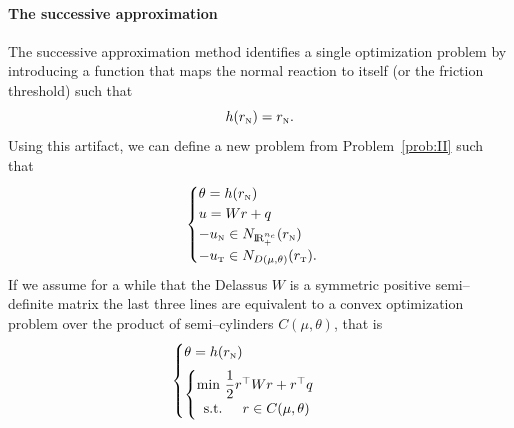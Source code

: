 {%

\paragraph{The successive approximation} The successive approximation method identifies a single optimization problem by introducing a function that maps the normal reaction to itself (or the friction threshold) such that
\begin{equation}
  \label{eq:Haslinger-g}
  h(r_\n)  = r_\n.
\end{equation}
Using this artifact, we can define a new problem from Problem~\ref{prob:II} such that
\begin{equation}
  \label{eq:Haslinger-1}
  \begin{cases}
    \theta = h(r_\n) \\
    u = W r + q \\
    -u_{\n} \in N_{\RR^{n_c}_+}(r_\n) \\
    -u_{\t} \in N_{D(\mu,\theta)}(r_\t).
  \end{cases}
\end{equation}
If we assume for a while that the Delassus $W$ is a symmetric positive semi--definite  matrix the last three lines are equivalent to a convex optimization problem over the product of semi--cylinders $C(\mu,\theta)$, that is
\begin{equation}
  \label{eq:Haslinger-2}
  \begin{cases}
    \theta = h(r_\n) \\[2mm]
    \begin{cases}
    \min\,  \Frac 1 2 r^\top W r + r^\top q \\
    \begin{array}{ll}
    \text{s.t. }& r \in C(\mu,\theta)
  \end{array}
\end{cases}


\end{cases}
\end{equation}}
